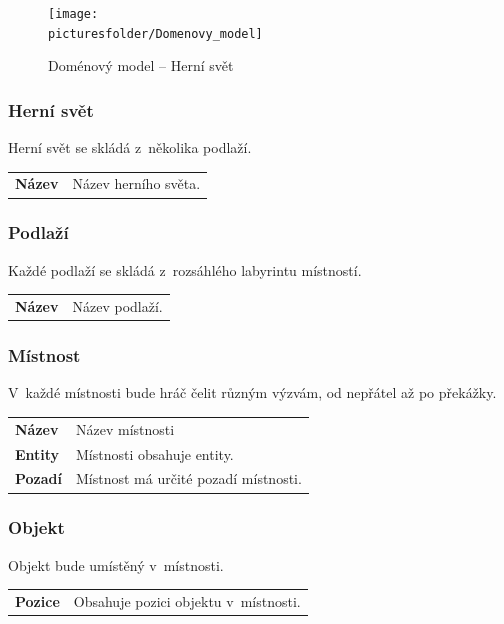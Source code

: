 \documentclass[12pt,a4paper]{article}
\def\picturesfolder{obrazky}
\begin{document}
\begin{figure}
\begin{center}
  \texttt{[image: \\picturesfolder/Domenovy\_model]}
  \caption{Doménový model -- Herní svět}
  \label{domenovy:hra}
\end{center}
\end{figure}

\subsubsection{Herní svět}
Herní svět se skládá z~několika podlaží.\\[5pt]

\begin{tabular*}{0.4\textwidth}{ll}
  \bf Název & Název herního světa.\\[7pt]
\end{tabular*}

\subsubsection{Podlaží}
Každé podlaží se skládá z~rozsáhlého labyrintu místností. \\[5pt]

\begin{tabular*}{0.4\textwidth}{ll}
  \bf Název & Název podlaží.\\[7pt]
\end{tabular*}

\subsubsection{Místnost}
V~každé místnosti bude hráč čelit různým výzvám, od nepřátel až po
překážky.\\[5pt]

\begin{tabular*}{0.55\textwidth}{ll}
  \bf Název & Název místnosti \\[7pt]
  \bf Entity & Místnosti obsahuje entity. \\[7pt]
  \bf Pozadí & Místnost má určité pozadí místnosti.\\[7pt]
\end{tabular*}

\subsubsection{Objekt}
Objekt bude umístěný v~místnosti.\\[5pt]
\begin{tabular*}{0.55\textwidth}{ll}
  \bf Pozice & Obsahuje pozici objektu v~místnosti.\\[7pt]
\end{tabular*}
\end{document}
